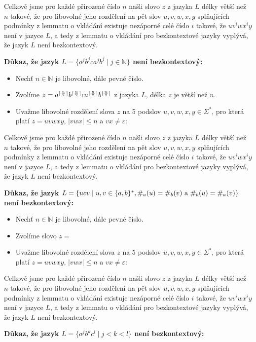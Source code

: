 \documentclass[12pt]{article}
\DeclarePairedDelimiter{\ceil}{\lceil}{\rceil}
\begin{document}
Celkově jsme pro každé přirozené číslo $n$ našli slovo $z$ z jazyka $L$ délky větší než $n$ takové, že pro libovolné jeho rozdělení na pět slov $u, v, w, x, y$ splňujících podmínky z lemmatu o vkládání existuje nezáporné celé číslo $i$ takové, že $uv^{i}wx^{i}y$ není v jazyce $L$, a tedy z lemmatu o vkládání pro bezkontextové jazyky vyplývá, že jazyk $L$ není bezkontextový.

\newpage{}

\textbf{Důkaz, že jazyk $L = \{ a^jb^jca^jb^j \mid j \in \mathbb{N} \}$ není bezkontextový:}

\begin{itemize}
    \item Nechť $n \in \mathbb{N}$ je libovolné, dále pevné číslo.
    \item Zvolíme $z=a^{\ceil{\frac{n}{2}}}b^{\ceil{\frac{n}{2}}}ca^{\ceil{\frac{n}{2}}}b^{\ceil{\frac{n}{2}}}$ z jazyka $L$, délka $z$ je větší než $n$.
    \item Uvažme libovolné rozdělení slova $z$ na 5 podslov $u, v, w, x, y \in \Sigma^{*}$, pro která platí $z=uvwxy$, $\lvert vwx \rvert \leq n$ a $vx \neq \varepsilon$:

    \vspace{13cm}
\end{itemize}

Celkově jsme pro každé přirozené číslo $n$ našli slovo $z$ z jazyka $L$ délky větší než $n$ takové, že pro libovolné jeho rozdělení na pět slov $u, v, w, x, y$ splňujících podmínky z lemmatu o vkládání existuje nezáporné celé číslo $i$ takové, že $uv^{i}wx^{i}y$ není v jazyce $L$, a tedy z lemmatu o vkládání pro bezkontextové jazyky vyplývá, že jazyk $L$ není bezkontextový.


\newpage{}

\textbf{Důkaz, že jazyk $L = \{  ucv \mid u, v \in \{ a,b \}^{*}, \#_{a}(u) = \#_{b}(v) \textnormal{ a } \#_{b}(u) = \#_{a}(v) \}$ není bezkontextový:}

\begin{itemize}
    \item Nechť $n \in \mathbb{N}$ je libovolné, dále pevné číslo.
    \item Zvolíme slovo $z =$
    \item Uvažme libovolné rozdělení slova $z$ na 5 podslov $u, v, w, x, y \in \Sigma^{*}$, pro která platí $z=uvwxy$, $\lvert vwx \rvert \leq n$ a $vx \neq \varepsilon$:

    \vspace{12cm}
\end{itemize}

Celkově jsme pro každé přirozené číslo $n$ našli slovo $z$ z jazyka $L$ délky větší než $n$ takové, že pro libovolné jeho rozdělení na pět slov $u, v, w, x, y$ splňujících podmínky z lemmatu o vkládání existuje nezáporné celé číslo $i$ takové, že $uv^{i}wx^{i}y$ není v jazyce $L$, a tedy z lemmatu o vkládání pro bezkontextové jazyky vyplývá, že jazyk $L$ není bezkontextový.


\newpage{}

\textbf{Důkaz, že jazyk $L = \{  a^{j}b^{k}c^{l} \mid j < k < l \}$ není bezkontextový:}



\end{document}
